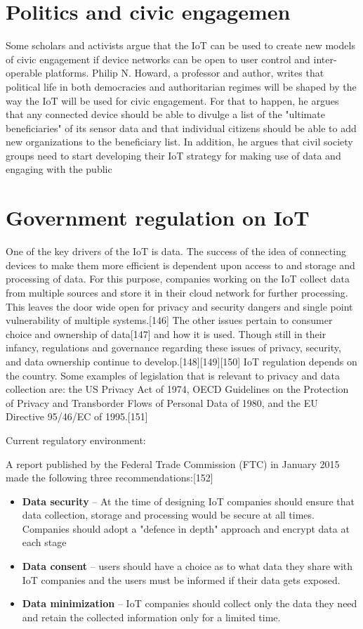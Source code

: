 \documentclass[12pt, a4paper, twoside]{article}
\begin{document}
\section{Politics and civic engagemen}
Some scholars and activists argue that the IoT can be used to create new models of civic engagement if device networks can be open to user control and inter-operable platforms. Philip N. Howard, a professor and author, writes that political life in both democracies and authoritarian regimes will be shaped by the way the IoT will be used for civic engagement. For that to happen, he argues that any connected device should be able to divulge a list of the "ultimate beneficiaries" of its sensor data and that individual citizens should be able to add new organizations to the beneficiary list. In addition, he argues that civil society groups need to start developing their IoT strategy for making use of data and engaging with the public

\section{Government regulation on IoT}
One of the key drivers of the IoT is data. The success of the idea of connecting devices to make them more efficient is dependent upon access to and storage and processing of data. For this purpose, companies working on the IoT collect data from multiple sources and store it in their cloud network for further processing. This leaves the door wide open for privacy and security dangers and single point vulnerability of multiple systems.[146] The other issues pertain to consumer choice and ownership of data[147] and how it is used. Though still in their infancy, regulations and governance regarding these issues of privacy, security, and data ownership continue to develop.[148][149][150] IoT regulation depends on the country. Some examples of legislation that is relevant to privacy and data collection are: the US Privacy Act of 1974, OECD Guidelines on the Protection of Privacy and Transborder Flows of Personal Data of 1980, and the EU Directive 95/46/EC of 1995.[151]

Current regulatory environment:

A report published by the Federal Trade Commission (FTC) in January 2015 made the following three recommendations:[152]

\begin{itemize}
  \item \textbf{Data security} – At the time of designing IoT companies should ensure that data collection, storage and processing would be secure at all times. Companies should adopt a "defence in depth" approach and encrypt data at each stage
  \item \textbf{Data consent} – users should have a choice as to what data they share with IoT companies and the users must be informed if their data gets exposed.
  \item  \textbf{Data minimization} – IoT companies should collect only the data they need and retain the collected information only for a limited time.
\end{itemize}
\end{document}
